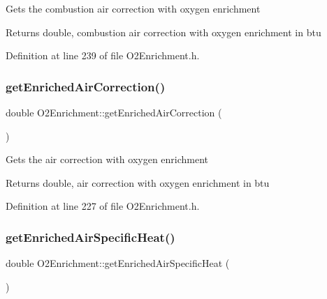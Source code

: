 Gets the combustion air correction with oxygen enrichment \begin{DoxyReturn}{Returns}
double, combustion air correction with oxygen enrichment in btu 
\end{DoxyReturn}


Definition at line 239 of file O2\+Enrichment.\+h.

\mbox{\label{class_o2_enrichment_a7e1eeaca64c46969c0652a46b67fad76}} 
\subsubsection{\texorpdfstring{get\+Enriched\+Air\+Correction()}{getEnrichedAirCorrection()}}
{\footnotesize\ttfamily double O2\+Enrichment\+::get\+Enriched\+Air\+Correction (\begin{DoxyParamCaption}{ }\end{DoxyParamCaption})\hspace{0.3cm}{\ttfamily [inline]}}

Gets the air correction with oxygen enrichment \begin{DoxyReturn}{Returns}
double, air correction with oxygen enrichment in btu 
\end{DoxyReturn}


Definition at line 227 of file O2\+Enrichment.\+h.

\mbox{\label{class_o2_enrichment_ac9fc3524b7243fbaac29884c1e6c5748}} 
\subsubsection{\texorpdfstring{get\+Enriched\+Air\+Specific\+Heat()}{getEnrichedAirSpecificHeat()}}
{\footnotesize\ttfamily double O2\+Enrichment\+::get\+Enriched\+Air\+Specific\+Heat (\begin{DoxyParamCaption}{ }\end{DoxyParamCaption})\hspace{0.3cm}{\ttfamily [inline]}}

